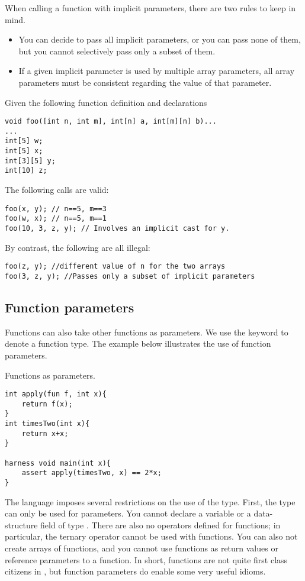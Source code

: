 When calling a function with implicit parameters, there are two rules to keep in mind.
\begin{itemize}
\item You can decide to pass all implicit parameters, or you can pass none of them, but you cannot selectively pass only a subset of them.
\item If a given implicit parameter is used by multiple array parameters, all array parameters must be consistent regarding the value of that parameter.
\end{itemize}

\begin{Example}
Given the following function definition and declarations
\begin{lstlisting}
void foo([int n, int m], int[n] a, int[m][n] b)...
...
int[5] w;
int[5] x;
int[3][5] y;
int[10] z;
\end{lstlisting}
The following calls are valid:
\begin{lstlisting}
foo(x, y); // n==5, m==3
foo(w, x); // n==5, m==1
foo(10, 3, z, y); // Involves an implicit cast for y.
\end{lstlisting}

By contrast, the following are all illegal:
\begin{lstlisting}
foo(z, y); //different value of n for the two arrays
foo(3, z, y); //Passes only a subset of implicit parameters
\end{lstlisting}
\end{Example}



\subsection{Function parameters}
Functions can also take other functions as parameters. We use the keyword  to denote a function type. The example below illustrates the use of function parameters.
\begin{Example}
Functions as parameters.
\begin{lstlisting}
int apply(fun f, int x){
	return f(x);
}
int timesTwo(int x){
	return x+x;
}

harness void main(int x){
	assert apply(timesTwo, x) == 2*x;
}
\end{lstlisting}
\end{Example}

The language imposes several restrictions on the use of the  type. First, the type can only be used for parameters. You cannot declare a variable or a data-structure field of type . There are also no operators defined for functions; in particular, the ternary operator  cannot be used with functions. You can also not create arrays of functions, and you cannot use functions as return values or reference parameters to a function. In short, functions are not quite first class citizens in \Sk{}, but function parameters do enable some very useful idioms.

